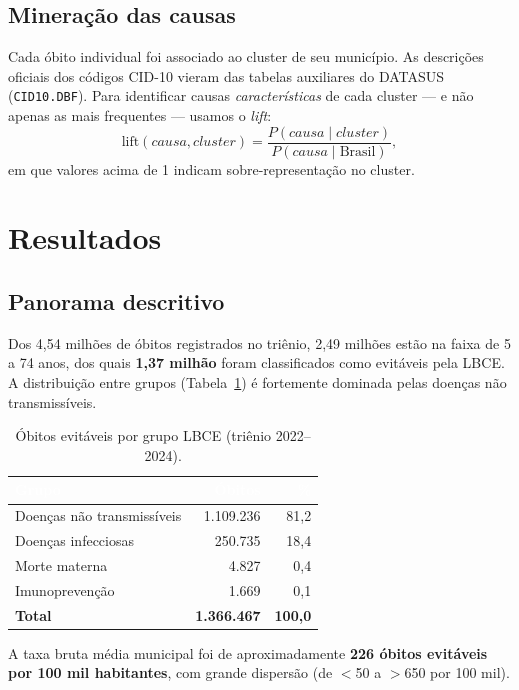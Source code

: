 \documentclass[11pt,a4paper]{article}
\newcommand{\hdr}[1]{\textcolor{white}{\textbf{#1}}}
\begin{document}
\subsection{Mineração das causas}

Cada óbito individual foi associado ao cluster de seu município. As descrições oficiais dos
códigos CID-10 vieram das tabelas auxiliares do DATASUS (\texttt{CID10.DBF}). Para identificar
causas \emph{características} de cada cluster --- e não apenas as mais frequentes --- usamos o
\emph{lift}:
\[
\text{lift}(causa, cluster) = \frac{P(causa \mid cluster)}{P(causa \mid \text{Brasil})},
\]
em que valores acima de 1 indicam sobre-representação no cluster.

\section{Resultados}

\subsection{Panorama descritivo}

Dos 4,54 milhões de óbitos registrados no triênio, 2,49 milhões estão na faixa de 5 a 74
anos, dos quais \textbf{1,37 milhão} foram classificados como evitáveis pela LBCE. A
distribuição entre grupos (Tabela~\ref{tab:grupos}) é fortemente dominada pelas doenças não
transmissíveis.

\begin{table}[htbp]
\centering\small
\caption{Óbitos evitáveis por grupo LBCE (triênio 2022--2024).}
\label{tab:grupos}
\begin{tabular}{l r r}
\rowcolor{cinzahdr}
\hdr{Grupo} & \hdr{Óbitos} & \hdr{\%} \\
\midrule
Doenças não transmissíveis & 1.109.236 & 81,2 \\
Doenças infecciosas        &   250.735 & 18,4 \\
Morte materna              &     4.827 &  0,4 \\
Imunoprevenção             &     1.669 &  0,1 \\
\midrule
\textbf{Total}             & \textbf{1.366.467} & \textbf{100,0} \\
\bottomrule
\end{tabular}
\end{table}

A taxa bruta média municipal foi de aproximadamente \textbf{226 óbitos evitáveis por 100 mil
habitantes}, com grande dispersão (de $<$50 a $>$650 por 100 mil).
\end{document}
